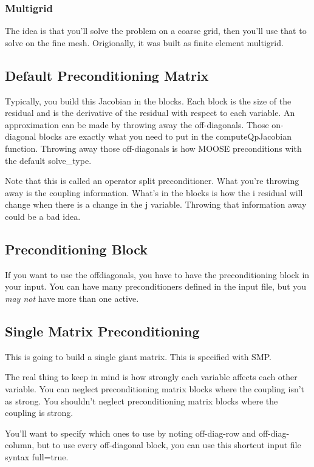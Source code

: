 \subsubsection{Multigrid}
The idea is that you'll solve the problem on a coarse grid, then you'll use that 
to solve on the fine mesh. Origionally, it was built as finite element multigrid. 


\subsection{Default Preconditioning Matrix}

Typically, you build this Jacobian in the blocks. Each block is the size of the 
residual and is the derivative of the residual with respect to each variable. An 
approximation can be made by throwing away the off-diagonals. Those on-diagonal 
blocks are exactly what you need to put in the computeQpJacobian function. 
Throwing away those off-diagonals is how MOOSE preconditions with the default 
solve\_type. 

Note that this is called an operator split preconditioner. What you're throwing 
away is the coupling information. What's in the blocks is how the i residual 
will change when there is a change in the j variable.  Throwing that information 
away could be a bad idea. 



\subsection{Preconditioning Block}
If you want to use the offdiagonals, you have to have the preconditioning block 
in your input. You can have many preconditioners defined in the input file, but 
you \emph{may not} have more than one active. 

\subsection{Single Matrix Preconditioning}
This is going to build a single giant matrix. This is specified with SMP. 

The real thing to keep in mind is how strongly each variable affects each other 
variable. You can neglect preconditioning matrix blocks where the coupling isn't 
as strong. You shouldn't neglect preconditioning matrix blocks where the 
coupling is strong. 

You'll want to specify which ones to use by noting off-diag-row and 
off-diag-column, but to use every off-diagonal block, you can use this shortcut 
input file syntax full=true. 

